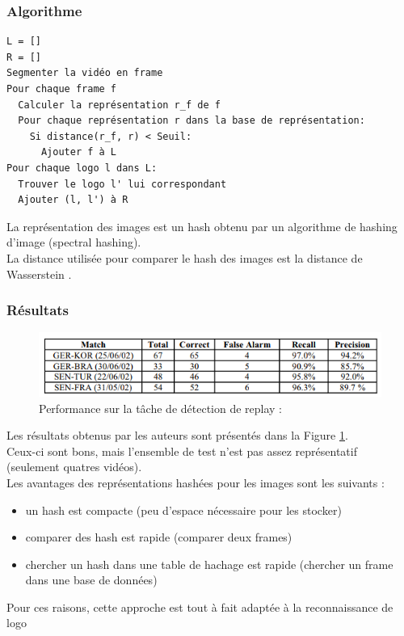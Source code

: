 \documentclass[11pt]{article}
\begin{document}
\subsubsection{Algorithme}
\label{sec:orgddf9f28}
\begin{verbatim}
L = []
R = []
Segmenter la vidéo en frame
Pour chaque frame f
  Calculer la représentation r_f de f
  Pour chaque représentation r dans la base de représentation:
    Si distance(r_f, r) < Seuil:
      Ajouter f à L
Pour chaque logo l dans L:
  Trouver le logo l' lui correspondant
  Ajouter (l, l') à R
\end{verbatim}
La représentation des images est un hash obtenu par un algorithme de hashing d'image (spectral hashing).\\
La distance utilisée pour comparer le hash des images est la distance de Wasserstein .\\


\subsubsection{Résultats}
\label{sec:orgdc93d9b}
\begin{figure}[htbp]
\centering
\includegraphics[width=.9\linewidth]{mean_shift_res.png}
\caption{Performance sur la tâche de détection de replay :\label{mean-shift-res}}
\end{figure}
Les résultats obtenus par les auteurs sont présentés dans la Figure \ref{mean-shift-res}.\\
Ceux-ci sont bons, mais l'ensemble de test n'est pas assez représentatif (seulement quatres vidéos).\\
Les avantages des représentations hashées pour les images sont les suivants :\\
\begin{itemize}
\item un hash est compacte (peu d'espace nécessaire pour les stocker)\\
\item comparer des hash est rapide (comparer deux frames)\\
\item chercher un hash dans une table de hachage est rapide (chercher un frame dans une base de données)\\
\end{itemize}
Pour ces raisons, cette approche est tout à fait adaptée à la reconnaissance de logo\\
\end{document}
